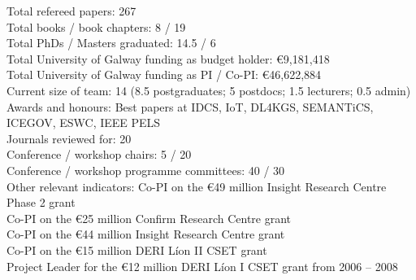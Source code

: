 \documentclass[12pt,a4paper]{res} %
\begin{document}
\begin{resume}
\begin{center}
Total refereed papers: \hfill 267 \\ %
Total books / book chapters: \hfill 8 / 19 \\ %
Total PhDs / Masters graduated: \hfill 14.5 / 6 \\
Total University of Galway funding as budget holder: \hfill \euro{}9,181,418 \\
Total University of Galway funding as PI / Co-PI: \hfill \euro{}46,622,884 \\
Current size of team: \hfill 14 (8.5 postgraduates; 5 postdocs; 1.5 lecturers; 0.5 admin) \\
Awards and honours: \hfill Best papers at IDCS, IoT, DL4KGS, SEMANTiCS, ICEGOV, ESWC, IEEE PELS \\
Journals reviewed for: \hfill 20 \\
Conference / workshop chairs: \hfill 5 / 20 \\
Conference / workshop programme committees: \hfill 40 / 30 \\
Other relevant indicators: \hfill Co-PI on the \euro{}49 million Insight Research Centre Phase 2 grant \\ \hfill Co-PI on the \euro{}25 million Confirm Research Centre grant \\ \hfill Co-PI on the \euro{}44 million Insight Research Centre grant \\ \hfill Co-PI on the \euro{}15 million DERI L\'{i}on II CSET grant \\ \hfill Project Leader for the \euro{}12 million DERI L\'{i}on I CSET grant from 2006 -- 2008
\end{center}


\vspace{0.2in} %

\vspace{0.2in} %

\end{resume} 
\end{document}
